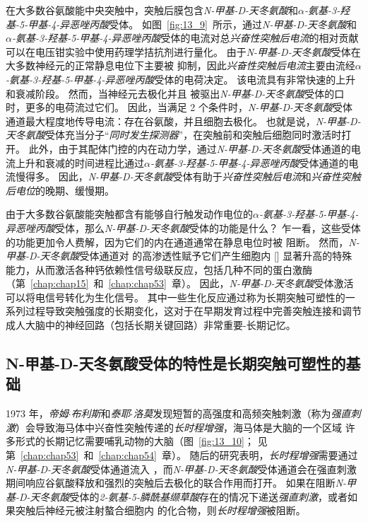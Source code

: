 在大多数谷氨酸能中央突触中，突触后膜包含\textit{N-甲基-D-天冬氨酸}和\textit{$\alpha$-氨基-3-羟基-5-甲基-4-异恶唑丙酸}受体。
如图~\ref{fig:13_9}~所示，通过\textit{N-甲基-D-天冬氨酸}和\textit{$\alpha$-氨基-3-羟基-5-甲基-4-异恶唑丙酸}受体的电流对总\textit{兴奋性突触后电流}的相对贡献可以在电压钳实验中使用药理学拮抗剂进行量化。
由于\textit{N-甲基-D-天冬氨酸}受体在大多数神经元的正常静息电位下主要被  抑制，因此\textit{兴奋性突触后电流}主要由流经\textit{$\alpha$-氨基-3-羟基-5-甲基-4-异恶唑丙酸}受体的电荷决定。
该电流具有非常快速的上升和衰减阶段。
然而，当神经元去极化并且  被驱出\textit{N-甲基-D-天冬氨酸}受体的口时，更多的电荷流过它们。
因此，当满足 2 个条件时，\textit{N-甲基-D-天冬氨酸}受体通道最大程度地传导电流：存在谷氨酸，并且细胞去极化。
也就是说，\textit{N-甲基-D-天冬氨酸}受体充当分子“\textit{同时发生探测器}”，在突触前和突触后细胞同时激活时打开。
此外，由于其配体门控的内在动力学，通过\textit{N-甲基-D-天冬氨酸}受体通道的电流上升和衰减的时间进程比通过\textit{$\alpha$-氨基-3-羟基-5-甲基-4-异恶唑丙酸}受体通道的电流慢得多。
因此，\textit{N-甲基-D-天冬氨酸}受体有助于\textit{兴奋性突触后电流}和\textit{兴奋性突触后电位}的晚期、缓慢期。


由于大多数谷氨酸能突触都含有能够自行触发动作电位的\textit{$\alpha$-氨基-3-羟基-5-甲基-4-异恶唑丙酸}受体，那么\textit{N-甲基-D-天冬氨酸}受体的功能是什么？
乍一看，这些受体的功能更加令人费解，因为它们的内在通道通常在静息电位时被  阻断。
然而，\textit{N-甲基-D-天冬氨酸}受体通道对  的高渗透性赋予它们产生细胞内 [] 显著升高的特殊能力，从而激活各种钙依赖性信号级联反应，包括几种不同的蛋白激酶（第~\ref{chap:chap15}~和~\ref{chap:chap53}~章）。
因此，\textit{N-甲基-D-天冬氨酸}受体激活可以将电信号转化为生化信号。
其中一些生化反应通过称为长期突触可塑性的一系列过程导致突触强度的长期变化，这对于在早期发育过程中完善突触连接和调节成人大脑中的神经回路（包括长期关键回路）非常重要-长期记忆。



\subsection{N-甲基-D-天冬氨酸受体的特性是长期突触可塑性的基础}

1973 年，\textit{帝姆$\cdot$布利斯}和\textit{泰耶$\cdot$洛莫}发现短暂的高强度和高频突触刺激（称为\textit{强直刺激}）会导致海马体中兴奋性突触传递的\textit{长时程增强}，海马体是大脑的一个区域 许多形式的长期记忆需要哺乳动物的大脑（图~\ref{fig:13_10}；
见第~\ref{chap:chap53}~和~\ref{chap:chap54}~章）。
随后的研究表明，\textit{长时程增强}需要通过\textit{N-甲基-D-天冬氨酸}受体通道流入 ，而\textit{N-甲基-D-天冬氨酸}受体通道会在强直刺激期间响应谷氨酸释放和强烈的突触后去极化的联合作用而打开。
如果在阻断\textit{N-甲基-D-天冬氨酸}受体的\textit{2-氨基-5-膦酰基缬草酸}存在的情况下递送\textit{强直刺激}，或者如果突触后神经元被注射螯合细胞内  的化合物，则\textit{长时程增强}被阻断。


